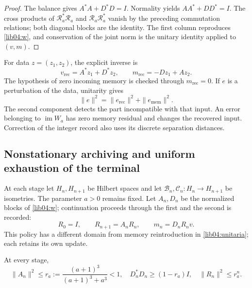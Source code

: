 \begin{proof}
The balance gives \(A^*A+D^*D=I\). Normality yields
\(AA^*+DD^*=I\). The cross products of
\(\mathscr R_a^*\mathscr R_a\) and
\(\mathscr R_a\mathscr R_a^*\) vanish by the preceding
commutation relations; both diagonal blocks are the identity. The first column
reproduces \eqref{lib04:w}, and conservation of the joint norm
is the unitary identity applied to \((v,m)\).
\end{proof}

For data \(z=(z_1,z_2)\), the explicit inverse is
\begin{equation}
 v_{\mathrm{rec}}=A^*z_1+D^*z_2,\qquad
 m_{\mathrm{rec}}=-Dz_1+Az_2.
 \label{lib04:inversa-unitaria}
\end{equation}
The hypothesis of zero incoming memory is checked through
\(m_{\mathrm{rec}}=0\). If \(e\) is a perturbation of the data,
unitarity gives
\begin{equation}
 \|e\|^2=\|e_{\mathrm{rec}}\|^2+\|e_{\mathrm{mem}}\|^2.
 \label{lib04:descomposicion-ruido}
\end{equation}
The second component detects the part incompatible with that input.
An error belonging to \(\operatorname{im}W_a\) has zero memory
residual and changes the recovered input. Correction of the integer
record also uses its discrete separation distances.



\subsection{Nonstationary archiving and uniform exhaustion of the terminal}
\label{lib04:archivo}

At each stage let \(H_n,H_{n+1}\) be Hilbert spaces and let
\(\mathcal B_n,\mathcal C_n:H_n\to H_{n+1}\) be isometries. The
parameter \(a>0\) remains fixed. Let \(A_n,D_n\) be the normalized
blocks of \eqref{lib04:w}; continuation proceeds through the first and
the second is recorded:
\begin{equation}
 R_0=I,\qquad R_{n+1}=A_nR_n,\qquad m_n=D_nR_nv.
 \label{lib04:politica-archivo}
\end{equation}
This policy has a different domain from memory reintroduction in
\eqref{lib04:unitaria}; each retains its own update.

\begin{lemma}
\label{lib04:lem-tasa}
At every stage,
\begin{equation}
 \|A_n\|^2\leq r_a:={\frac{(a+1)^3}{(a+1)^3+a^3}}<1,
 \quad D_n^*D_n\geq(1-r_a)I,
 \quad\|R_n\|^2\leq r_a^n.
 \label{lib04:tasa}
\end{equation}
\end{lemma}

